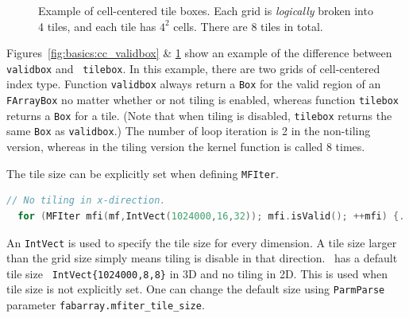{{{\begin{figure}
\begin{minipage}{0.45\textwidth}
    \caption{\label{fig:basics:cc_tilebox} Example of cell-centered tile boxes.
      Each grid is {\emph{logically}} broken into 4 tiles, and each
      tile has $4^2$ cells.  There are 8 tiles in total.}
  \end{minipage}
\end{figure}

Figures~\ref{fig:basics:cc_validbox} \& \ref{fig:basics:cc_tilebox}
show an example of the difference between {\tt validbox} and {\tt
  tilebox}.  In this example, there are two grids of cell-centered
index type.  Function {\tt validbox} always return a {\tt Box} for the
valid region of an {\tt FArrayBox} no matter whether or not tiling is
enabled, whereas function {\tt tilebox} returns a {\tt Box} for a
tile.  (Note that when tiling is disabled, {\tt tilebox} returns the
same {\tt Box} as {\tt validbox}.)  The number of loop iteration is 2
in the non-tiling version, whereas in the tiling version the kernel
function is called 8 times.

The tile size can be explicitly set when defining {\tt MFIter}.
\begin{lstlisting}[language=cpp]
  // No tiling in x-direction.
  for (MFIter mfi(mf,IntVect(1024000,16,32)); mfi.isValid(); ++mfi) {...}
\end{lstlisting}
An {\tt IntVect} is used to specify the tile size for every dimension.
A tile size larger than the grid size simply means tiling is disable
in that direction.  \amrex\ has a default tile size {\tt
  IntVect\{1024000,8,8\}} in 3D and no tiling in 2D.  This is used when
tile size is not explicitly set.  One can change the default size
using {\tt ParmParse} parameter {\tt fabarray.mfiter\_tile\_size}.

}}}
